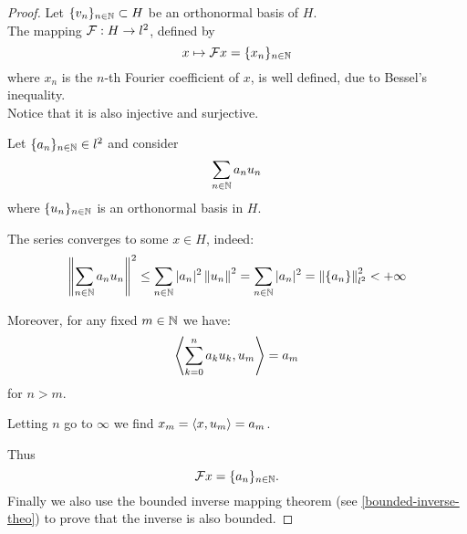 \begin{proof}
	Let $\{v_n\}_{n \in \mathbb N} \subset H$ be an orthonormal basis of $H$.\\
	The mapping $\mathcal F : H \to l^2$, defined by
	$$
	x 
	\mapsto \mathcal F x 
	= \{x_n\}_{n \in \mathbb N}$$
	where $x_n$ is the $n$-th Fourier coefficient of $x$, is well defined, due to Bessel's inequality.\\
	Notice that it is also injective and surjective.
	
	Let $\{a_n\}_{n \in \mathbb N} \in l^2$ and consider
	$$
	\sum_{n\in\mathbb N}a_n u_n
	$$
	where $\{u_n\}_{n \in \mathbb N}$ is an orthonormal basis in $H$.
	
	The series converges to some $x \in H$, indeed:
	$$
	\left\lVert\sum_{n\in \mathbb N} a_n u_n\right\rVert^2 \leq \sum_{n\in \mathbb N}|a_n|^2 \left\lVert u_n\right\rVert^2 = \sum_{n\in \mathbb N}|a_n|^2 = \left\lVert\{a_n\}\right\rVert_{l^2}^2 < +\infty 
	$$
	
	Moreover, for any fixed $m \in \mathbb N$ we have:
	$$
		\left\langle\sum_{k=0}^n a_k u_k, u_m\right\rangle
		= a_m
	$$
	for $n > m$.
	
	Letting $n$ go to $\infty$ we find $x_m = \left\langle x, u_m\right\rangle = a_m$.
	
	Thus
	$$
	\mathcal F x 
	= \{a_n\}_{n \in \mathbb N}.
	$$
	Finally we also use the bounded inverse mapping theorem (see \vref{bounded-inverse-theo}) to prove that the inverse is also bounded.
	
%	
%	
\end{proof}


